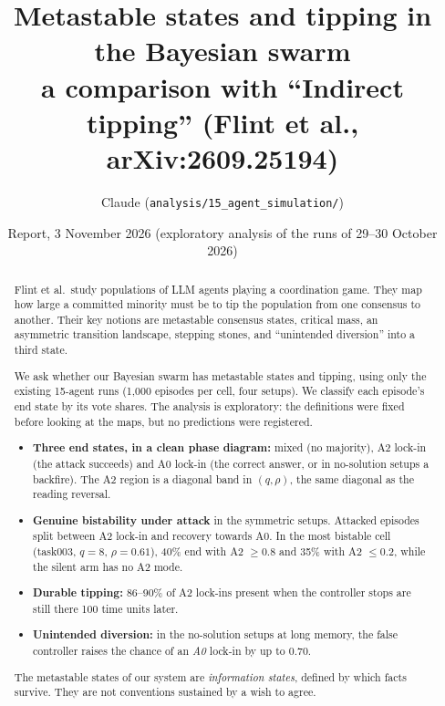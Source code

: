 \documentclass[10pt,a4paper]{article}
\title{\textbf{Metastable states and tipping in the Bayesian swarm}\\[2pt]
\large a comparison with ``Indirect tipping'' (Flint et al., arXiv:2609.25194)}
\author{Claude (\nolinkurl{analysis/15_agent_simulation/})}
\date{Report, 3 November 2026 (exploratory analysis of the runs of 29--30 October 2026)}
\begin{document}
\maketitle

\begin{abstract}
\noindent
Flint et al.\ study populations of LLM agents playing a coordination game. They map how large a committed minority
must be to tip the population from one consensus to another. Their key notions are metastable consensus states, critical
mass, an asymmetric transition landscape, stepping stones, and ``unintended diversion'' into a third state.

We ask whether our Bayesian swarm has metastable states and tipping, using only the existing 15-agent runs (1,000
episodes per cell, four setups). We classify each episode's end state by its vote shares. The analysis is exploratory:
the definitions were fixed before looking at the maps, but no predictions were registered.
\begin{itemize}
\item \textbf{Three end states, in a clean phase diagram:} mixed (no majority), A2 lock-in (the attack succeeds) and
  A0 lock-in (the correct answer, or in no-solution setups a backfire). The A2 region is a diagonal band in
  $(q,\rho)$, the same diagonal as the reading reversal.
\item \textbf{Genuine bistability under attack} in the symmetric setups. Attacked episodes split between A2 lock-in
  and recovery towards A0. In the most bistable cell (task003, $q=8$, $\rho=0.61$), 40\% end with A2 $\ge0.8$ and
  35\% with A2 $\le0.2$, while the silent arm has no A2 mode.
\item \textbf{Durable tipping:} 86--90\% of A2 lock-ins present when the controller stops are still there 100 time
  units later.
\item \textbf{Unintended diversion:} in the no-solution setups at long memory, the false controller raises the chance
  of an \emph{A0} lock-in by up to 0.70.
\end{itemize}
The metastable states of our system are \emph{information states}, defined by which facts survive. They are not
conventions sustained by a wish to agree.
\end{abstract}

\end{document}

